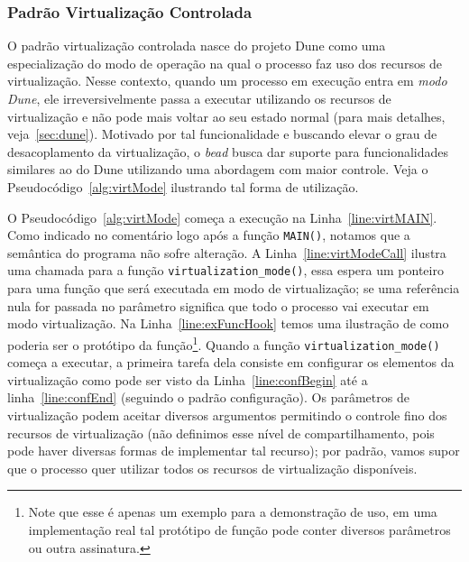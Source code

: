\subsubsection{Padrão Virtualização Controlada}

O padrão virtualização controlada nasce do projeto Dune como uma especialização
do modo de operação na qual o processo faz uso dos recursos de virtualização.
Nesse contexto, quando um processo em execução entra em \emph{modo Dune}, ele
irreversivelmente passa a executar utilizando os recursos de virtualização e
não pode mais voltar ao seu estado normal (para mais detalhes,
veja~\ref{sec:dune}). Motivado por tal funcionalidade e buscando elevar o grau
de desacoplamento da virtualização, o \emph{bead} busca dar suporte para
funcionalidades similares ao do Dune utilizando uma abordagem com maior
controle. Veja o Pseudocódigo~\ref{alg:virtMode} ilustrando tal forma de
utilização.



O Pseudocódigo~\ref{alg:virtMode} começa a execução na
Linha~\ref{line:virtMAIN}. Como indicado no comentário logo após a função
\texttt{MAIN()}, notamos que a semântica do programa não sofre alteração. A
Linha~\ref{line:virtModeCall} ilustra uma chamada para a função
\texttt{virtualization\_mode()}, essa espera um ponteiro para uma função que
será executada em modo de virtualização; se uma referência nula for passada no
parâmetro significa que todo o processo vai executar em modo virtualização. Na
Linha~\ref{line:exFuncHook} temos uma ilustração de como poderia ser o
protótipo da função\footnote{Note que esse é apenas um exemplo para a
demonstração de uso, em uma implementação real tal protótipo de função pode
conter diversos parâmetros ou outra assinatura.}. Quando a função
\texttt{virtualization\_mode()} começa a executar, a primeira tarefa dela
consiste em configurar os elementos da virtualização como pode ser visto da
Linha~\ref{line:confBegin} até a linha~\ref{line:confEnd} (seguindo o padrão
configuração). Os parâmetros de virtualização podem aceitar diversos argumentos
permitindo o controle fino dos recursos de virtualização (não definimos esse
nível de compartilhamento, pois pode haver diversas formas de implementar tal
recurso); por padrão, vamos supor que o processo quer utilizar todos os
recursos de virtualização disponíveis.

